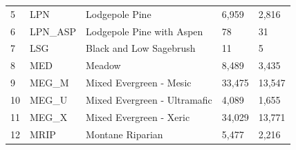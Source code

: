 \begin{table}[!htbp]
\begin{tabular}{@{}lllll@{}}
\rowcolor[HTML]{CAD6BA} 
5                                                           & LPN                                                                & Lodgepole Pine                               & 6,959                                                   & 2,816                                                      \\
6                                                           & LPN\_ASP                                                           & Lodgepole Pine with Aspen                    & 78                                                      & 31                                                         \\
\rowcolor[HTML]{CAD6BA} 
7                                                           & LSG                                                                & Black and Low Sagebrush                      & 11                                                      & 5                                                          \\
8                                                           & MED                                                                & Meadow                                       & 8,489                                                   & 3,435                                                      \\
\rowcolor[HTML]{CAD6BA} 
9                                                           & MEG\_M                                                             & Mixed Evergreen - Mesic                      & 33,475                                                  & 13,547                                                     \\
10                                                          & MEG\_U                                                             & Mixed Evergreen - Ultramafic                 & 4,089                                                   & 1,655                                                      \\
\rowcolor[HTML]{CAD6BA} 
11                                                          & MEG\_X                                                             & Mixed Evergreen - Xeric                      & 34,029                                                  & 13,771                                                     \\
12                                                          & MRIP                                                               & Montane Riparian                             & 5,477                                                   & 2,216                                                      \\

\end{tabular}
\end{table}
